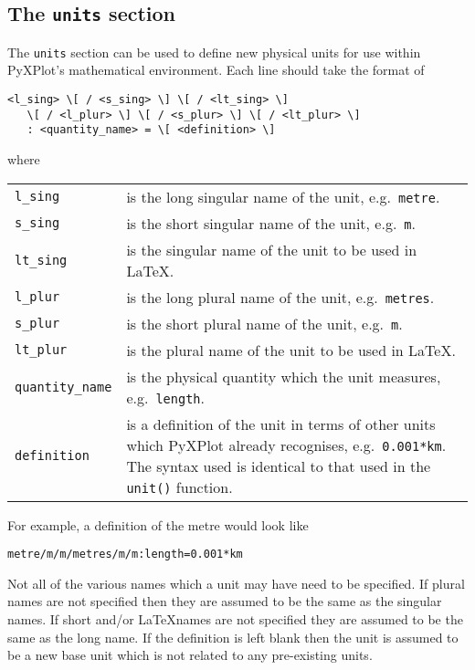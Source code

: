 \renewcommand{\arraystretch}{1.00}

\subsection{The {\tt units} section}
\label{sec:configfile_units}

The {\tt units} section can be used to define new physical units for use within
PyXPlot's mathematical environment. Each line should take the format of
\begin{verbatim}
<l_sing> \[ / <s_sing> \] \[ / <lt_sing> \]
   \[ / <l_plur> \] \[ / <s_plur> \] \[ / <lt_plur> \]
   : <quantity_name> = \[ <definition> \]
\end{verbatim}
where
\begin{longtable}{p{3.4cm}p{9cm}}
{\tt l\_sing} & is the long singular name of the unit, e.g.\ {\tt metre}.\\
{\tt s\_sing} & is the short singular name of the unit, e.g.\ {\tt m}.\\
{\tt lt\_sing} & is the singular name of the unit to be used in \LaTeX.\\
{\tt l\_plur} & is the long plural name of the unit, e.g.\ {\tt metres}.\\
{\tt s\_plur} & is the short plural name of the unit, e.g.\ {\tt m}.\\
{\tt lt\_plur} & is the plural name of the unit to be used in \LaTeX.\\
{\tt quantity\_name} & is the physical quantity which the unit measures, e.g.\ {\tt length}.\\
{\tt definition} & is a definition of the unit in terms of other units which
PyXPlot already recognises, e.g.\ {\tt 0.001*km}. The syntax used is identical
to that used in the {\tt unit()} function.\\
\end{longtable}
For example, a definition of the metre would look like
\begin{verbatim}
metre/m/m/metres/m/m:length=0.001*km
\end{verbatim}

Not all of the various names which a unit may have need to be specified. If
plural names are not specified then they are assumed to be the same as the
singular names. If short and/or \LaTeX names are not specified they are assumed
to be the same as the long name. If the definition is left blank then the unit
is assumed to be a new base unit which is not related to any pre-existing
units.

